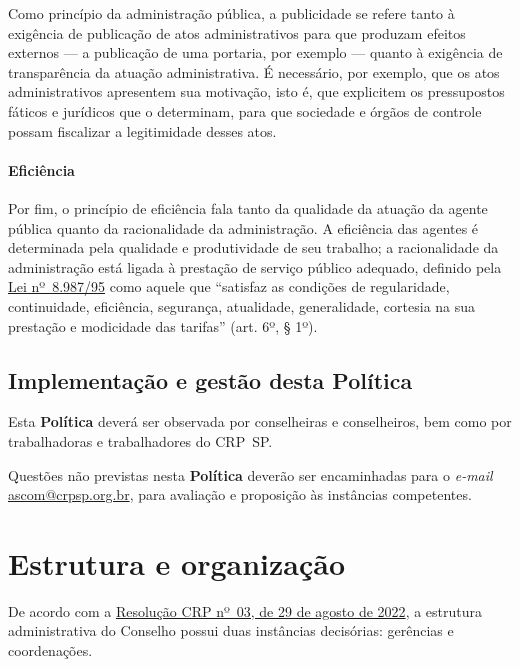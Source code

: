 Como princípio da administração pública, a publicidade se refere tanto à
exigência de publicação de atos administrativos para que produzam
efeitos externos --- a publicação de uma portaria, por exemplo ---
quanto à exigência de transparência da atuação administrativa. É
necessário, por exemplo, que os atos administrativos apresentem sua
motivação, isto é, que explicitem os pressupostos fáticos e jurídicos
que o determinam, para que sociedade e órgãos de controle possam
fiscalizar a legitimidade desses atos.

\subsubsection{Eficiência}

Por fim, o princípio de eficiência fala tanto da qualidade da atuação da
agente pública quanto da racionalidade da administração. A eficiência
das agentes é determinada pela qualidade e produtividade de seu
trabalho; a racionalidade da administração está ligada à prestação de
serviço público adequado, definido pela
\href{https://www.planalto.gov.br/ccivil_03/leis/l8987cons.htm}{Lei
  nº~8.987/95} como aquele que ``satisfaz as condições de regularidade,
continuidade, eficiência, segurança, atualidade, generalidade, cortesia
na sua prestação e modicidade das tarifas'' (art. 6º, § 1º).

\section{Implementação e gestão desta
  Política}

Esta \textbf{Política} deverá ser observada por conselheiras e
conselheiros, bem como por trabalhadoras e trabalhadores do CRP~SP.

Questões não previstas nesta \textbf{Política} deverão ser encaminhadas
para o \emph{e-mail}
\href{mailto:ascom@crpsp.org.br}{ascom@crpsp.org.br}, para
avaliação e proposição às instâncias competentes.

\chapter{Estrutura e organização}

De acordo com a
\href{https://transparencia.cfp.org.br/crp06/wp-content/uploads/sites/29/2022/09/Resolucao-03-22-PECS-f-1-assinada.pdf}{Resolução
  CRP nº~03, de 29 de agosto de 2022}, a estrutura administrativa do
Conselho possui duas instâncias decisórias: gerências e coordenações.

